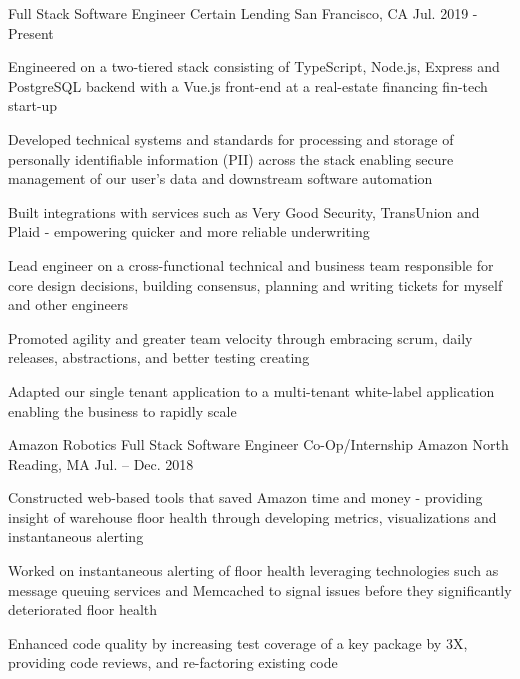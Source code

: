 

 




\begin{cventries}

  \cventry
     {Full Stack Software Engineer}
     {Certain Lending}
     {San Francisco, CA}
     {Jul. 2019 - Present}
     {
       \begin{cvitems}
			\item{Engineered on a two-tiered stack consisting of TypeScript, Node.js, Express and PostgreSQL backend with a Vue.js front-end at a real-estate financing fin-tech start-up}
			\item{Developed technical systems and standards for processing and storage of personally identifiable information (PII) across the stack enabling secure management of our user's data and downstream software automation}
			\item{Built integrations with services such as Very Good Security, TransUnion and Plaid - empowering quicker and more reliable underwriting}
       		\item{Lead engineer on a cross-functional technical and business team responsible for core design decisions, building consensus, planning and writing tickets for myself and other engineers}
       		\item{Promoted agility and greater team velocity through embracing scrum, daily releases, abstractions, and better testing creating}
       		\item{Adapted our single tenant application to a multi-tenant white-label application enabling the business to rapidly scale}
       \end{cvitems}
     }
	 \cventry
    {Amazon Robotics Full Stack Software Engineer Co-Op/Internship} %
    {Amazon} %
    {North Reading, MA} %
    {Jul. – Dec. 2018} %
    {
    	\begin{cvitems} %
    		    \item {Constructed web-based tools that saved Amazon time and money - providing insight of warehouse floor health through developing metrics, visualizations and instantaneous alerting} 
    			\item {Worked on instantaneous alerting of floor health leveraging technologies such as message queuing services and Memcached to signal issues before they significantly deteriorated floor health} 
    			\item {Enhanced code quality by increasing test coverage of a key package by 3X, providing code reviews, and re-factoring existing code}  			
    		 \end{cvitems}
    }


\end{cventries}
